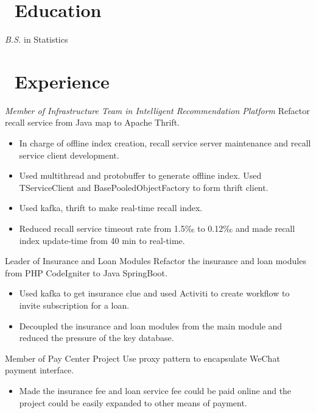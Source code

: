 \documentclass{resume}
\begin{document}



\section{\faGraduationCap\ Education}
\textit{B.S.} in Statistics

\section{\faUsers\ Experience}
\textit{Member of Infrastructure Team in Intelligent Recommendation Platform}
Refactor recall service from Java map to Apache Thrift.
\begin{itemize}
  \item In charge of offline index creation, recall service server maintenance and recall service client development.
  \item Used multithread and protobuffer to generate offline index. Used TServiceClient and BasePooledObjectFactory to form thrift client.
  \item Used kafka, thrift to make real-time recall index.
  \item Reduced recall service timeout rate from 1.5‰ to 0.12‰ and made recall index update-time from 40 min to real-time.
\end{itemize}

Leader of Insurance and Loan Modules
Refactor the insurance and loan modules from PHP CodeIgniter to Java SpringBoot.
\begin{itemize}
  \item Used kafka to get insurance clue and used Activiti to create workflow to invite subscription for a loan.
  \item Decoupled the insurance and loan modules from the main module and reduced the pressure of the key database.
\end{itemize}

Member of Pay Center Project
Use proxy pattern to encapsulate WeChat payment interface.
\begin{itemize}
  \item Made the insurance fee and loan service fee could be paid online and the project could be easily expanded to other means of payment.
\end{itemize}
\end{document}
